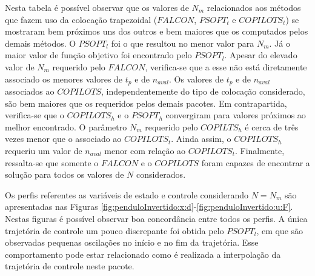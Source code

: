 
Nesta tabela é possível observar que os valores de $ N_m $ relacionados aos métodos que fazem uso da colocação trapezoidal ($ FALCON $, $ PSOPT_t $ e $ COPILOTS_t $)  se mostraram bem próximos uns dos outros e bem maiores que os computados pelos demais métodos. O $ PSOPT_l $ foi o que resultou no menor valor para $ N_m $. Já o maior valor de função objetivo foi encontrado pelo $ PSOPT_l $. Apesar do elevado valor de $ N_m $ requerido pelo $ FALCON $, verifica-se que a esse não está diretamente associado os menores valores de $ t_p $ e de $ n_{aval} $. Os valores de $ t_p $ e de $ n_{aval} $ associados ao $ COPILOTS $, independentemente do tipo de colocação considerado, são bem maiores que os requeridos pelos demais pacotes. Em contrapartida, verifica-se que o $ COPILOTS_h $ e o $ PSOPT_h $ convergiram para valores próximos ao melhor encontrado. O parâmetro $ N_m $ requerido pelo $ COPILTS_h $ é cerca de três vezes menor que o associado ao $ COPILOTS_t $. Ainda assim, o $ COPILOTS_h $ requeriu um valor de $ n_{aval} $ menor com relação ao $ COPILOTS_t $. Finalmente, ressalta-se que somente o $ FALCON $ e o $ COPILOTS $ foram capazes de encontrar a solução para todos os valores de $ N $ considerados. 


Os perfis referentes as variáveis de estado e controle considerando $ N = N_m $ são apresentadas nas Figuras \ref{fig:penduloInvertido:x:d}-\ref{fig:penduloInvertido:u:F}. 
Nestas figuras é possível observar boa concordância entre todos os perfis. A única trajetória de controle um pouco discrepante foi obtida pelo $ PSOPT_l $, em que são observadas pequenas oscilações no início e no fim da trajetória. Esse comportamento pode estar relacionado como é realizada a interpolação da trajetória de controle neste pacote.

